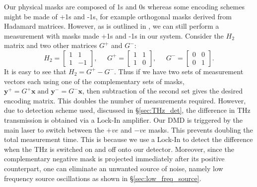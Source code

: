 Our physical masks are composed of 1s and 0s whereas some encoding schemes might be made of +1s and -1s, for example orthogonal masks derived from Hadamard matrices. However, as is outlined in \cite{hadamard_multiplex}, we can still perform a measurement with masks made +1s and -1s in our system. Consider the $H_2$ matrix and two other matrices $G^+$ and $G^-$:
\begin{equation}
H_2=\left[{\begin{array}{cc}1 & 1 \\ 1 & -1 \end{array} }\right],
\; \; \; \; \;
G^+=\left[{\begin{array}{cc}1 & 1 \\ 1 & 0 \end{array} }\right],
\; \; \; \; \;
G^-=\left[{\begin{array}{cc}0 & 0 \\ 0 & 1 \end{array} }\right].
\label{eq:H2}
\end{equation}
It is easy to see that $H_2=G^+ - G^-$. Thus if we have two sets of measurement vectors each using one of the complementary sets of masks, $\mathbf{y}^+=G^+\mathbf{x} \; \text{and } \mathbf{y}^-=G^-\mathbf{x}$, then subtraction of the second set gives the desired encoding matrix. This doubles the number of measurements required. However, due to detection scheme used, discussed in \S \ref{sec:THz_det}, the difference in THz transmission is obtained via a Lock-In amplifier. Our DMD is triggered by the main laser to switch between the $+ve$ and $-ve$ masks. This prevents doubling the total measurement time. This is because we use a Lock-In to detect the difference when the THz is switched on and off onto our detector. Moreover, since the complementary negative mask is projected immediately after its positive counterpart, one can eliminate an unwanted source of noise, namely low frequency source oscillations as shown in \S\ref{sec:low_freq_source}. 

\newpage
